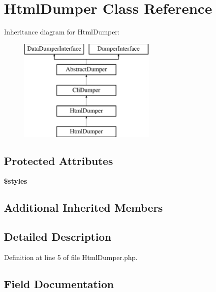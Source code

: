 \section{Html\+Dumper Class Reference}
\label{class_illuminate_1_1_support_1_1_debug_1_1_html_dumper}
Inheritance diagram for Html\+Dumper\+:\begin{figure}[H]
\begin{center}
\leavevmode
\includegraphics[height=5.000000cm]{class_illuminate_1_1_support_1_1_debug_1_1_html_dumper}
\end{center}
\end{figure}
\subsection*{Protected Attributes}
\begin{DoxyCompactItemize}
\item 
{\bf \$styles}
\end{DoxyCompactItemize}
\subsection*{Additional Inherited Members}


\subsection{Detailed Description}


Definition at line 5 of file Html\+Dumper.\+php.



\subsection{Field Documentation}
